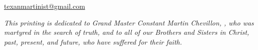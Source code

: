 \url{texanmartinist@gmail.com}

\vspace*{\fill}

\blankpage

\vspace*{\fill}
	\begin{center}\end{center}
\vspace*{3em}
\textit{This printing is dedicated to Grand Master Constant Martin Chevillon, \sigi{}, who was martyred in the search of truth, and to all of our Brothers and Sisters in Christ, past, present, and future, who have suffered for their faith.}

\vspace*{\fill}

\blankpage
